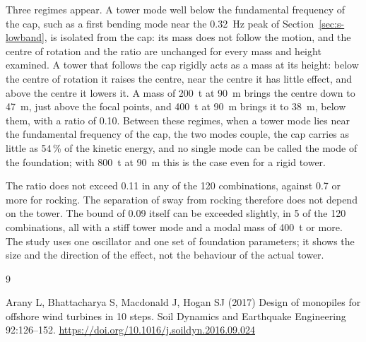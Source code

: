 \documentclass[11pt]{article}
\begin{document}
Three regimes appear. A tower mode well below the fundamental frequency of the
cap, such as a first bending mode near the 0.32~Hz peak of
Section~\ref{sec:s-lowband}, is isolated from the cap: its mass does not follow
the motion, and the centre of rotation and the ratio are unchanged for every
mass and height examined. A tower that follows the cap rigidly acts as a mass
at its height: below the centre of rotation it raises the centre, near the
centre it has little effect, and above the centre it lowers it. A mass of
200~t at 90~m brings the centre down to 47~m, just above the focal points, and
400~t at 90~m brings it to 38~m, below them, with a ratio of 0.10. Between
these regimes, when a tower mode lies near the fundamental
frequency of the cap, the two modes couple, the cap carries as little as 54\,\%
of the kinetic energy, and no single mode can be called the mode of the
foundation; with 800~t at 90~m this is the case even for a rigid tower.

The ratio does not exceed 0.11 in any of the 120 combinations, against 0.7 or
more for rocking. The separation of sway from rocking therefore does not depend
on the tower. The bound of 0.09 itself can be exceeded slightly, in 5 of the 120
combinations, all with a stiff tower mode and a modal mass of 400~t or more. The study uses one
oscillator and one set of foundation parameters; it shows the size and the
direction of the effect, not the behaviour of the actual tower.

\begin{thebibliography}{9}

Arany L, Bhattacharya S, Macdonald J, Hogan SJ (2017) Design of monopiles for offshore wind turbines in 10 steps. Soil Dynamics and Earthquake Engineering 92:126--152. \url{https://doi.org/10.1016/j.soildyn.2016.09.024}

\end{thebibliography}
\end{document}
